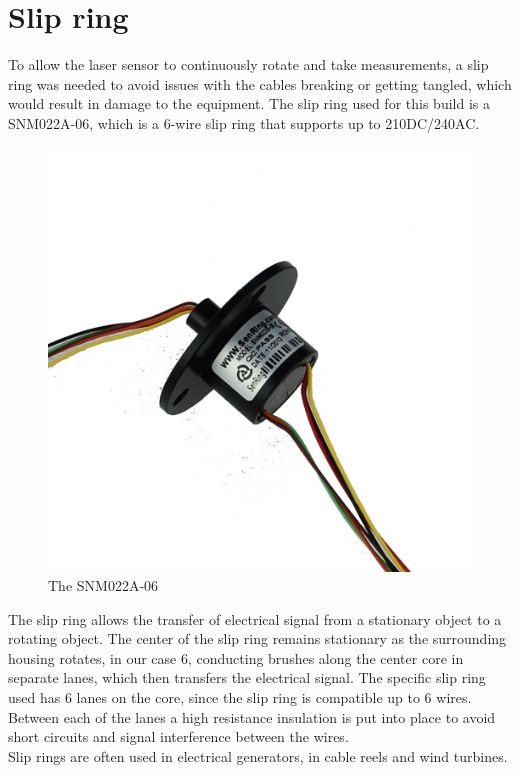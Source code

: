 \clearpage
\section{Slip ring}

To allow the laser sensor to continuously rotate and take measurements, a slip ring was needed to avoid issues with the cables breaking or getting tangled, which would result in damage to the equipment. 
The slip ring used for this build is a SNM022A-06\cite{slipring}, which is a 6-wire slip ring that supports up to 210DC/240AC. 

\begin{figure}[H]
	\centering
	\includegraphics[width=.5\linewidth]{images/slipring-pic.jpg}
	\caption{The SNM022A-06\cite{slipringfig}}
	\label{slipringpic}	
\end{figure}

The slip ring allows the transfer of electrical signal from a stationary object to a rotating object. The center of the slip ring remains stationary as the surrounding housing rotates, in our case 6, conducting brushes along the center core in separate lanes, which then transfers the electrical signal.
The specific slip ring used has 6 lanes on the core, since the slip ring is compatible up to 6 wires. Between each of the lanes a high resistance insulation is put into place to avoid short circuits and signal interference between the wires\cite{slipringhow}.\\
Slip rings are often used in electrical generators, in cable reels and wind turbines.


